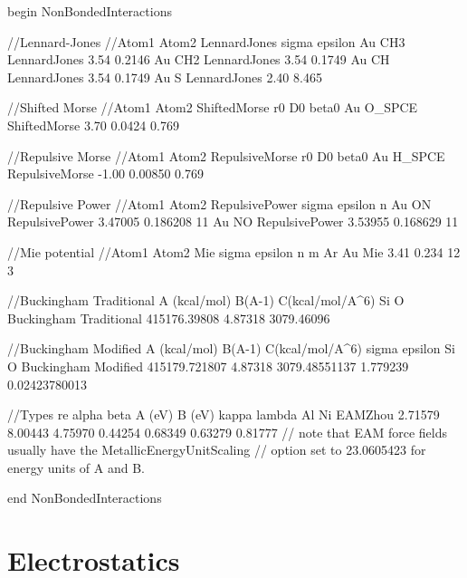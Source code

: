 \documentclass[]{book}
\begin{document}
\begin{code}[caption={[An example of a NonBondedInteractions block.] A
simple example of a NonBondedInteractions block. Distances ($\sigma,
r_0$) are given in \AA, while energies ($\epsilon, D0$) are in
kcal/mol.  The Morse potentials have an additional parameter $\beta_0$
which is in units of \AA$^{-1}$.},
label={sch:NonBondedInteractionTypes}]
begin NonBondedInteractions

//Lennard-Jones
//Atom1 Atom2   LennardJones    sigma  epsilon
Au      CH3     LennardJones    3.54   0.2146
Au      CH2     LennardJones    3.54   0.1749 
Au      CH      LennardJones    3.54   0.1749 
Au      S       LennardJones    2.40   8.465

//Shifted Morse
//Atom1 Atom2   ShiftedMorse    r0     D0       beta0
Au      O_SPCE  ShiftedMorse    3.70   0.0424   0.769

//Repulsive Morse
//Atom1 Atom2   RepulsiveMorse  r0     D0       beta0
Au      H_SPCE  RepulsiveMorse  -1.00  0.00850  0.769

//Repulsive Power
//Atom1 Atom2   RepulsivePower   sigma    epsilon    n
Au      ON      RepulsivePower   3.47005  0.186208   11
Au      NO      RepulsivePower   3.53955  0.168629   11

//Mie potential
//Atom1 Atom2   Mie              sigma   epsilon  n  m
Ar      Au      Mie              3.41    0.234   12  3

//Buckingham Traditional      A (kcal/mol)  B(A-1)   C(kcal/mol/A^6)
Si O Buckingham Traditional   415176.39808  4.87318  3079.46096

//Buckingham Modified    A (kcal/mol)  B(A-1)  C(kcal/mol/A^6) sigma    epsilon
Si O Buckingham Modified 415179.721807 4.87318 3079.48551137   1.779239 0.02423780013

//Types       re        alpha   beta    A (eV)  B (eV)  kappa   lambda
Al Ni EAMZhou 2.71579   8.00443 4.75970 0.44254 0.68349 0.63279 0.81777
// note that EAM force fields usually have the MetallicEnergyUnitScaling 
// option set to 23.0605423 for energy units of A and B.

end NonBondedInteractions
\end{code}

\section{\label{section:electrostatics}Electrostatics}
\end{document}
